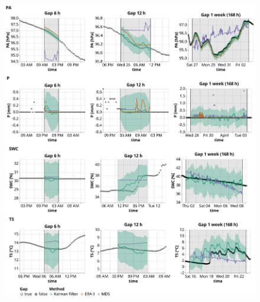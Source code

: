 \documentclass{article}
\newcommand{\imgwidth}{6in}
\begin{document}
\begin{figure}
\centerline{\includegraphics[width=\imgwidth]{timeseries_2_1}}
\caption{}
\label{fig:ts_2-2}
\end{figure}
\end{document}
